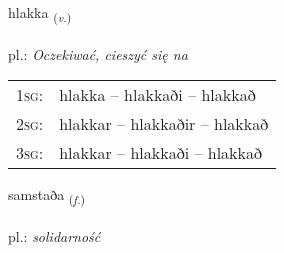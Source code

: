 \documentclass[frontgrid, backgrid]{flacards}\usepackage[]{graphicx}\usepackage[]{xcolor}
\begin{document}
\renewcommand{\flhead}{\vskip5pt \fboxsep=0pt {\small\bfseries\footnotesize Sagnorð | czasownik}}
\renewcommand{\fcfoot}{\vskip5pt \fboxsep=0pt \hspace{2pt}{\small\bfseries\footnotesize 3K}}

\renewcommand{\blhead}{\vskip5pt {\small\bfseries\footnotesize Sagnorð | czasownik }}
\renewcommand{\bcfoot}{\vskip5pt \hspace{2pt}{\small\bfseries\footnotesize 3K}}


{hlakka \small{\textsubscript{(\textit{v.})}} \\[1ex] %
\textphonetic{[l̥ahka]} \\
pl.: \emph{Oczekiwać, cieszyć się na} \\  [2ex]
\renewcommand*{\arraystretch}{0.8}
\begin{tabular}{p{1cm}l}
\textsc{1sg}: & hlakka -- hlakkaði -- hlakkað \\ 
\textsc{2sg}: & hlakkar -- hlakkaðir -- hlakkað \\ 
\textsc{3sg}: & hlakkar -- hlakkaði -- hlakkað \\ 
\end{tabular}
}

\renewcommand{\flhead}{\vskip5pt \fboxsep=0pt {\small\bfseries\footnotesize Nafnorð | rzeczownik}}
\renewcommand{\fcfoot}{\vskip5pt \fboxsep=0pt \hspace{2pt}{\small\bfseries\footnotesize 3K}}

\renewcommand{\blhead}{\vskip5pt {\small\bfseries\footnotesize Nafnorð | rzeczownik }}
\renewcommand{\bcfoot}{\vskip5pt \hspace{2pt}{\small\bfseries\footnotesize 3K}}


{samstaða \small{\textsubscript{(\textit{f.})}} \\[1ex] %
\textphonetic{[samstaða]} \\
pl.: \emph{solidarność} \\  [2ex]
\renewcommand*{\arraystretch}{0.8}
}
\end{document}
